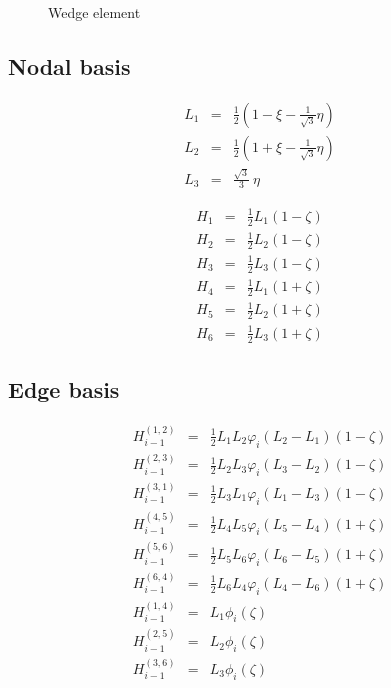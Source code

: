 \begin{figure}[tbhp]
\begin{center}

\caption{Wedge element}
\end{center}
\end{figure}

\subsection{Nodal basis}

\begin{eqnarray*}
L_1&=&\frac{1}{2}(1-\xi-\frac{1}{\sqrt{3}}\eta) \\
L_2&=&\frac{1}{2}(1+\xi-\frac{1}{\sqrt{3}}\eta) \\
L_3&=&\frac{\sqrt{3}}{3}\ \eta 
\end{eqnarray*}

\begin{eqnarray*}
H_1&=&\frac{1}{2}L_1(1-\zeta) \\
H_2&=&\frac{1}{2}L_2(1-\zeta) \\
H_3&=&\frac{1}{2}L_3(1-\zeta) \\
H_4&=&\frac{1}{2}L_1(1+\zeta) \\
H_5&=&\frac{1}{2}L_2(1+\zeta) \\
H_6&=&\frac{1}{2}L_3(1+\zeta)
\end{eqnarray*}

\subsection{Edge basis}

\begin{eqnarray*}
H_{i-1}^{(1,2)}&=&\frac{1}{2}L_1L_2\varphi_i(L_2-L_1)(1-\zeta) \\
H_{i-1}^{(2,3)}&=&\frac{1}{2}L_2L_3\varphi_i(L_3-L_2)(1-\zeta) \\
H_{i-1}^{(3,1)}&=&\frac{1}{2}L_3L_1\varphi_i(L_1-L_3)(1-\zeta) \\
H_{i-1}^{(4,5)}&=&\frac{1}{2}L_4L_5\varphi_i(L_5-L_4)(1+\zeta) \\
H_{i-1}^{(5,6)}&=&\frac{1}{2}L_5L_6\varphi_i(L_6-L_5)(1+\zeta) \\
H_{i-1}^{(6,4)}&=&\frac{1}{2}L_6L_4\varphi_i(L_4-L_6)(1+\zeta) \\
H_{i-1}^{(1,4)}&=&L_1\phi_i(\zeta) \\
H_{i-1}^{(2,5)}&=&L_2\phi_i(\zeta) \\
H_{i-1}^{(3,6)}&=&L_3\phi_i(\zeta)
\end{eqnarray*}

